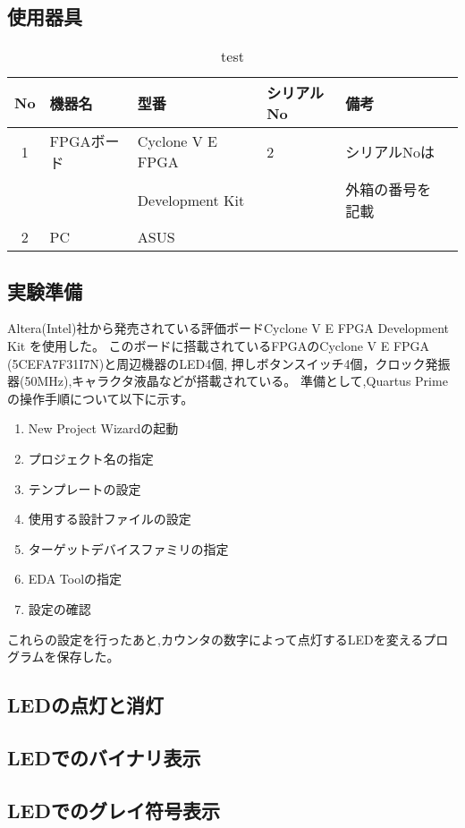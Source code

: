 \documentclass{ltjsarticle}
\begin{document}
	\subsection{使用器具}
		\begin{table}[H]
		\centering
		\caption{test}
		\label{tab:used}
		\begin{tabular}{clllll} \toprule
		No&\multicolumn{1}{l}{機器名}&\multicolumn{1}{l}{型番}&\multicolumn{1}{l}{シリアルNo}&\multicolumn{1}{l}{備考}\\ \hline
		1&FPGAボード&Cyclone V E FPGA&2&シリアルNoは\\
		&&Development Kit&&外箱の番号を記載\\
		2&PC&ASUS &&\\
		\bottomrule
		\end{tabular}
		\end{table}
	\subsection{実験準備}
		Altera(Intel)社から発売されている評価ボードCyclone V E FPGA Development Kit を使用した。
		このボードに搭載されているFPGAのCyclone V E FPGA (5CEFA7F31I7N)と周辺機器のLED4個,
		押しボタンスイッチ4個，クロック発振器(50MHz),キャラクタ液晶などが搭載されている。
		準備として,Quartus Primeの操作手順について以下に示す。
		\begin{enumerate}
			\item New Project Wizardの起動
			\item プロジェクト名の指定
			\item テンプレートの設定
			\item 使用する設計ファイルの設定
			\item ターゲットデバイスファミリの指定
			\item EDA Toolの指定
			\item 設定の確認
		\end{enumerate}
		これらの設定を行ったあと,カウンタの数字によって点灯するLEDを変えるプログラムを保存した。
		
	\subsection{LEDの点灯と消灯}
	\subsection{LEDでのバイナリ表示}
	\subsection{LEDでのグレイ符号表示}
\end{document}
